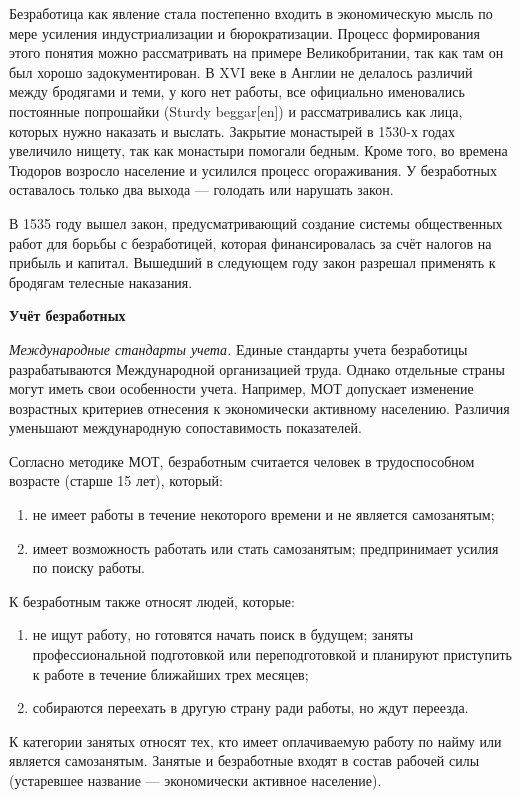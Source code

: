 Безработица как явление стала постепенно входить в экономическую мысль по мере усиления индустриализации и бюрократизации. Процесс формирования этого понятия можно рассматривать на примере Великобритании, так как там он был хорошо задокументирован. В XVI веке в Англии не делалось различий между бродягами и теми, у кого нет работы, все официально именовались постоянные попрошайки (Sturdy beggar[en]) и рассматривались как лица, которых нужно наказать и выслать. Закрытие монастырей в 1530-х годах увеличило нищету, так как монастыри помогали бедным. Кроме того, во времена Тюдоров возросло население и усилился процесс огораживания. У безработных оставалось только два выхода — голодать или нарушать закон.

В 1535 году вышел закон, предусматривающий создание системы общественных работ для борьбы с безработицей, которая финансировалась за счёт налогов на прибыль и капитал. Вышедший в следующем году закон разрешал применять к бродягам телесные наказания.

\textbf{Учёт безработных}

\textit{Международные стандарты учета.}
Единые стандарты учета безработицы разрабатываются Международной организацией труда. Однако отдельные страны могут иметь свои особенности учета. Например, МОТ допускает изменение возрастных критериев отнесения к экономически активному населению. Различия уменьшают международную сопоставимость показателей.

Согласно методике МОТ, безработным считается человек в трудоспособном возрасте (старше 15 лет), который:
\begin{enumerate}
    \item не имеет работы в течение некоторого времени и не является самозанятым;
    \item имеет возможность работать или стать самозанятым;
          предпринимает усилия по поиску работы.
\end{enumerate}


К безработным также относят людей, которые:
\begin{enumerate}
    \item не ищут работу, но готовятся начать поиск в будущем;
          заняты профессиональной подготовкой или переподготовкой и планируют приступить к работе в течение ближайших трех месяцев;
    \item собираются переехать в другую страну ради работы, но ждут переезда.
\end{enumerate}
К категории занятых относят тех, кто имеет оплачиваемую работу по найму или является самозанятым. Занятые и безработные входят в состав рабочей силы (устаревшее название — экономически активное население).


